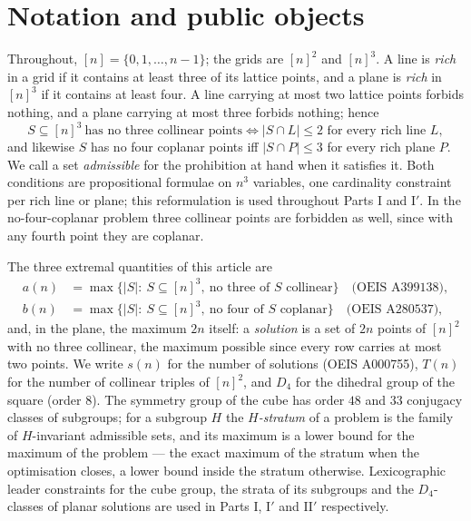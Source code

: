 \documentclass[11pt,a4paper]{article}
\begin{document}
\section{Notation and public objects}\label{s:notation}
Throughout, $[n]=\{0,1,\dots,n-1\}$; the grids are $[n]^2$ and $[n]^3$.  A line is \emph{rich} in a grid if it contains at least
three of its lattice points, and a plane is \emph{rich} in $[n]^3$ if it contains at least four.  A line carrying at most two
lattice points forbids nothing, and a plane carrying at most three forbids nothing; hence
\begin{equation}\label{eq:reform}
S\subseteq[n]^3\ \text{has no three collinear points}\iff |S\cap L|\le 2 \text{ for every rich line } L,
\end{equation}
and likewise $S$ has no four coplanar points iff $|S\cap P|\le3$ for every rich plane $P$.  We call a set \emph{admissible} for
the prohibition at hand when it satisfies it.  Both conditions are propositional formulae on $n^3$ variables, one cardinality
constraint per rich line or plane; this reformulation is used throughout Parts I and I$'$.  In the no-four-coplanar problem three
collinear points are forbidden as well, since with any fourth point they are coplanar.

The three extremal quantities of this article are
\begin{align*}
a(n)&=\max\{|S|:\ S\subseteq[n]^3,\ \text{no three of } S \text{ collinear}\}\quad\text{(OEIS A399138)},\\
b(n)&=\max\{|S|:\ S\subseteq[n]^3,\ \text{no four of } S \text{ coplanar}\}\quad\text{(OEIS A280537)},
\end{align*}
and, in the plane, the maximum $2n$ itself: a \emph{solution} is a set of $2n$ points of $[n]^2$ with no three collinear, the
maximum possible since every row carries at most two points.  We write $s(n)$ for the number of solutions (OEIS A000755), $T(n)$
for the number of collinear triples of $[n]^2$, and $D_4$ for the dihedral group of the square (order $8$).  The symmetry group of
the cube has order $48$ and $33$ conjugacy classes of subgroups; for a subgroup $H$ the \emph{$H$-stratum} of a problem is the
family of $H$-invariant admissible sets, and its maximum is a lower bound for the maximum of the problem --- the exact maximum of
the stratum when the optimisation closes, a lower bound inside the stratum otherwise.  Lexicographic leader constraints for the cube
group, the strata of its subgroups and the $D_4$-classes of planar solutions are used in Parts I, I$'$ and II$'$ respectively.
\end{document}
